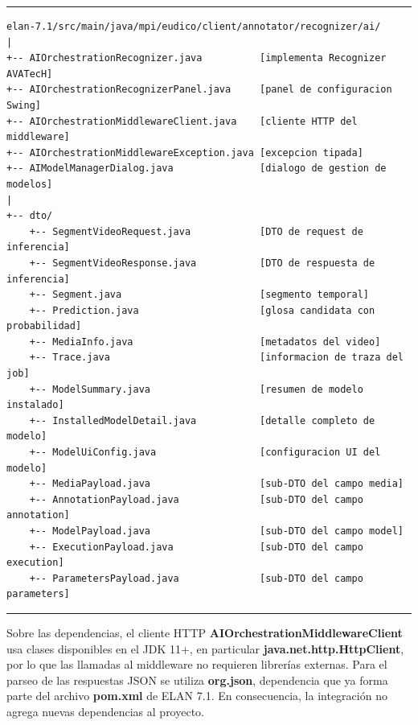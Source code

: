 \documentclass[11pt,a4paper]{article}
\begin{document}
\begin{center}
\begin{minipage}{0.96\textwidth}
\hrule
\vspace{0.06cm}
\scriptsize
\begin{Verbatim}[baselinestretch=0.68]
elan-7.1/src/main/java/mpi/eudico/client/annotator/recognizer/ai/
|
+-- AIOrchestrationRecognizer.java          [implementa Recognizer AVATecH]
+-- AIOrchestrationRecognizerPanel.java     [panel de configuracion Swing]
+-- AIOrchestrationMiddlewareClient.java    [cliente HTTP del middleware]
+-- AIOrchestrationMiddlewareException.java [excepcion tipada]
+-- AIModelManagerDialog.java               [dialogo de gestion de modelos]
|
+-- dto/
    +-- SegmentVideoRequest.java            [DTO de request de inferencia]
    +-- SegmentVideoResponse.java           [DTO de respuesta de inferencia]
    +-- Segment.java                        [segmento temporal]
    +-- Prediction.java                     [glosa candidata con probabilidad]
    +-- MediaInfo.java                      [metadatos del video]
    +-- Trace.java                          [informacion de traza del job]
    +-- ModelSummary.java                   [resumen de modelo instalado]
    +-- InstalledModelDetail.java           [detalle completo de modelo]
    +-- ModelUiConfig.java                  [configuracion UI del modelo]
    +-- MediaPayload.java                   [sub-DTO del campo media]
    +-- AnnotationPayload.java              [sub-DTO del campo annotation]
    +-- ModelPayload.java                   [sub-DTO del campo model]
    +-- ExecutionPayload.java               [sub-DTO del campo execution]
    +-- ParametersPayload.java              [sub-DTO del campo parameters]
\end{Verbatim}
\vspace{0.03cm}
\hrule

\label{fig:paquete_java_ai}
\end{minipage}
\end{center}

Sobre las dependencias, el cliente HTTP \textbf{AIOrchestrationMiddlewareClient} usa clases disponibles en el JDK 11+, en particular \textbf{java.net.http.HttpClient}, por lo que las llamadas al middleware no requieren librerías externas. Para el parseo de las respuestas JSON se utiliza \textbf{org.json}, dependencia que ya forma parte del archivo \textbf{pom.xml} de ELAN 7.1. En consecuencia, la integración no agrega nuevas dependencias al proyecto.
\end{document}
